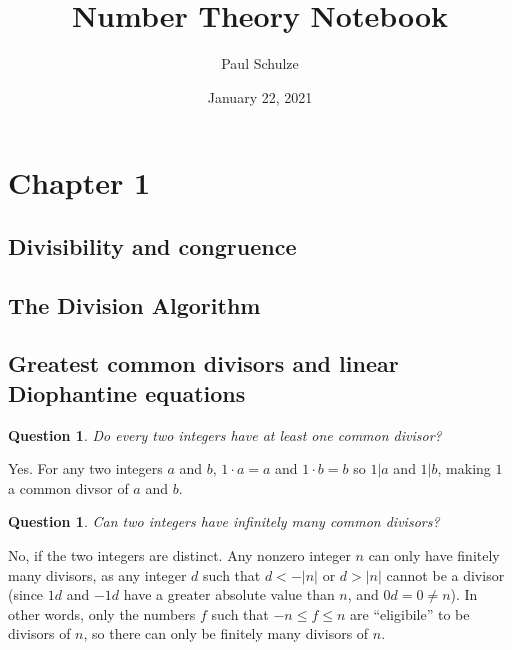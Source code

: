 \documentclass{article}
\title{Number Theory Notebook}
\author{Paul Schulze}
\date{January 22, 2021}
\newtheorem{ques}[thm]{Question}
\numberwithin{equation}{thm}
\begin{document}
\maketitle



\section{Chapter 1}


\subsection*{Divisibility and congruence}




\subsection*{The Division Algorithm}




\subsection*{Greatest common divisors and linear Diophantine equations}



\begin{ques} \label{1.29}
  Do every two integers have at least one common divisor?
\end{ques}

Yes. For any two integers $a$ and $b$, $1 \cdot a = a$ and $1 \cdot b = b$ so $1 | a$ and $1 | b$, making $1$ a common divsor of $a$ and $b$.



\begin{ques} \label{1.30}
  Can two integers have infinitely many common divisors?
\end{ques}

No, if the two integers are distinct. Any nonzero integer $n$ can only have finitely many divisors, as any integer $d$ such that $d < -|n|$ or $d > |n|$ cannot be a divisor (since $1d$ and $-1d$ have a greater absolute value than $n$, and $0d = 0 \neq n$). In other words, only the numbers $f$ such that $-n \leq f \leq n$ are ``eligibile'' to be divisors of $n$, so there can only be finitely many divisors of $n$.
\end{document}
